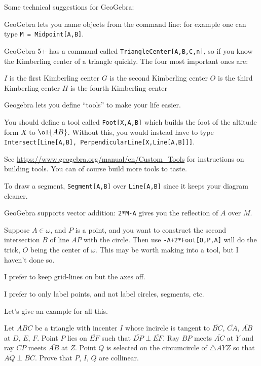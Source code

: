 \documentclass[11pt]{scrartcl}
\begin{document}
Some technical suggestions for GeoGebra:
\begin{itemize}
  \ii GeoGebra lets you name objects from the command line:
  for example one can type \texttt{M = Midpoint[A,B]}.

  \ii GeoGebra 5+ has a command called \texttt{TriangleCenter[A,B,C,n]},
  so if you know the Kimberling center of a triangle quickly.
  The four most important ones are:
  \begin{itemize}
    \ii $I$ is the first Kimberling center
    \ii $G$ is the second Kimberling center
    \ii $O$ is the third Kimberling center
    \ii $H$ is the fourth Kimberling center
  \end{itemize}

  \ii Geogebra lets you define ``tools'' to make your life easier.

  You should define a tool called \texttt{Foot[X,A,B]} which builds
  the foot of the altitude form $X$ to $\ol{AB}$.
  Without this, you would instead have to type
  \texttt{Intersect[Line[A,B], PerpendicularLine[X,Line[A,B]]]}.

  See \url{https://www.geogebra.org/manual/en/Custom_Tools}
  for instructions on building tools.
  You can of course build more tools to taste.

  \ii To draw a segment, \texttt{Segment[A,B]} over \texttt{Line[A,B]}
  since it keeps your diagram cleaner.

  \ii GeoGebra supports vector addition: \texttt{2*M-A}
  gives you the reflection of $A$ over $M$.

  \ii Suppose $A \in \omega$, and $P$ is a point, and you want to construct
  the second intersection $B$ of line $AP$ with the circle.
  Then use \texttt{-A+2*Foot[O,P,A]} will do the trick,
  $O$ being the center of $\omega$.
  This may be worth making into a tool, but I haven't done so.

  \ii I prefer to keep grid-lines on but the axes off.

  \ii I prefer to only label points, and not label circles, segments, etc.
\end{itemize}

Let's give an example for all this.

\begin{example}
[HMMT 2016]
Let $ABC$ be a triangle with incenter $I$
whose incircle is tangent to $\overline{BC}$, $\overline{CA}$, $\overline{AB}$
at $D$, $E$, $F$.
Point $P$ lies on $\overline{EF}$ such that $\overline{DP} \perp \overline{EF}$.
Ray $BP$ meets $\overline{AC}$ at $Y$ and ray $CP$ meets $\overline{AB}$ at $Z$.
Point $Q$ is selected on the circumcircle of $\triangle AYZ$
so that $\overline{AQ} \perp \overline{BC}$.
Prove that $P$, $I$, $Q$ are collinear.
\end{example}
\end{document}

